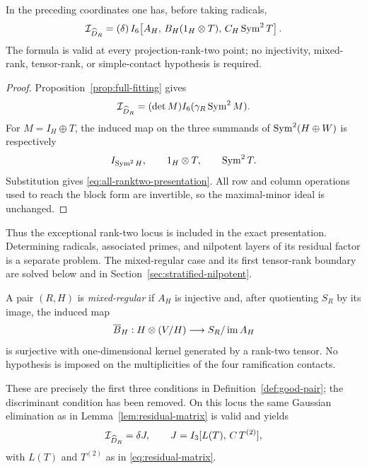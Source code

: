 \begin{theorem}
\label{thm:ranktwo-full-presentation}
In the preceding coordinates one has, before taking radicals,
\begin{equation}\label{eq:all-ranktwo-presentation}
 \mathcal I_{\widehat D_R}
 =
 (\delta)\,
 I_6\!\left[
 A_H,\,
 B_H(1_H\otimes T),\,
 C_H\operatorname{Sym}^2T
 \right].
\end{equation}
The formula is valid at every projection-rank-two point; no
injectivity, mixed-rank, tensor-rank, or simple-contact hypothesis is
required.
\end{theorem}
\begin{proof}
Proposition~\ref{prop:full-fitting} gives
\[
 \mathcal I_{\widehat D_R}
 =(\det M)I_6(\gamma_R\operatorname{Sym}^2M).
\]
For $M=I_H\oplus T$, the induced map on the three summands of
$\operatorname{Sym}^2(H\oplus W)$ is respectively
\[
 I_{\operatorname{Sym}^2H},\qquad 1_H\otimes T,\qquad\operatorname{Sym}^2T.
\]
Substitution gives \eqref{eq:all-ranktwo-presentation}.  All row and
column operations used to reach the block form are invertible, so the
maximal-minor ideal is unchanged.
\end{proof}

Thus the exceptional rank-two locus is included in the exact
presentation.  Determining radicals, associated primes, and nilpotent
layers of its residual factor is a separate problem.  The mixed-regular
case and its first tensor-rank boundary are solved below and in
Section~\ref{sec:stratified-nilpotent}.

\begin{definition}\label{def:mixed-regular}
A pair $(R,H)$ is \emph{mixed-regular} if
$A_H$ is injective and, after quotienting $S_R$ by its image, the
induced map
\[
 \overline B_H:H\otimes(V/H)\longrightarrow
 S_R/\operatorname{im} A_H
\]
is surjective with one-dimensional kernel generated by a rank-two
tensor.  No hypothesis is imposed on the multiplicities of the four
ramification contacts.
\end{definition}

These are precisely the first three conditions in
Definition~\ref{def:good-pair}; the discriminant condition has been
removed.  On this locus the same Gaussian elimination as in
Lemma~\ref{lem:residual-matrix} is valid and yields
\[
 \mathcal I_{\widehat D_R}=\delta J,\qquad
 J=I_3[L(T),\,C\,T^{(2)}],
\]
with $L(T)$ and $T^{(2)}$ as in \eqref{eq:residual-matrix}.

